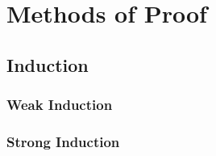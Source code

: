 \chapter{Methods of Proof}

\section{Induction}

\subsection{Weak Induction}

\subsection{Strong Induction}
